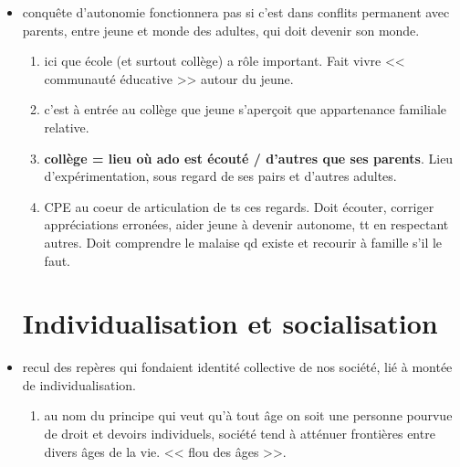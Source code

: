 \documentclass[12pt]{report}
\begin{document}
\begin{itemize}
\begin{itemize}
\item conquête d'autonomie fonctionnera pas si c'est dans conflits permanent avec parents, entre jeune et monde des adultes, qui doit devenir son monde. \\
\begin{enumerate}
\item ici que école (et surtout collège) a rôle important. Fait vivre << communauté éducative >> autour du jeune. \\
\item c'est à entrée au collège que jeune s'aperçoit que appartenance familiale relative.\\
\item \textbf{collège = lieu où ado est écouté / d'autres que ses parents}. Lieu d'expérimentation, sous regard de ses pairs et d'autres adultes. \\
\item CPE au coeur de articulation de ts ces regards. Doit écouter, corriger appréciations erronées, aider jeune à devenir autonome, tt en respectant autres. Doit comprendre le malaise qd existe et recourir à famille s'il le faut.\\
\end{enumerate}


\section{Individualisation et socialisation}


\item recul des repères qui fondaient identité collective de nos société, lié à montée de individualisation.\\
\begin{enumerate}
\item au nom du principe qui veut qu'à tout âge on soit une personne pourvue de droit et devoirs individuels, société tend à atténuer frontières entre divers âges de la vie. << flou des âges >>. \\
\end{enumerate}


\end{itemize}
\end{itemize}
\end{document}
